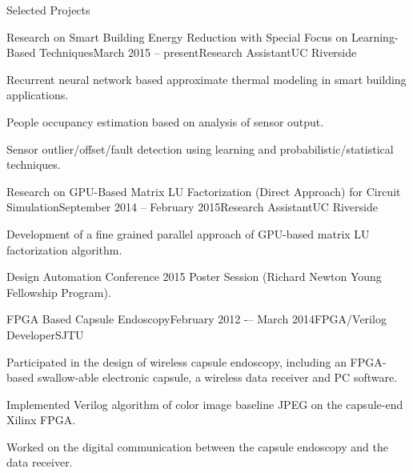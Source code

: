 \documentclass{resume} %
\begin{document}
\begin{rSection}{Selected Projects}


    \begin{rSubsection}{Research on Smart Building Energy Reduction with Special Focus on Learning-Based Techniques}{March 2015 -- present}{Research Assistant}{UC Riverside}

    \item Recurrent neural network based approximate thermal modeling in smart
        building applications.

    \item People occupancy estimation based on analysis of sensor output.

    \item Sensor outlier/offset/fault detection using learning and
        probabilistic/statistical techniques.

    \end{rSubsection}

    \begin{rSubsection}{Research on GPU-Based Matrix LU Factorization (Direct Approach) for Circuit Simulation}{September 2014 -- February 2015}{Research Assistant}{UC Riverside}

    \item Development of a fine grained parallel approach of GPU-based matrix
        LU factorization algorithm.

    \item Design Automation Conference 2015 Poster Session (Richard Newton
        Young Fellowship Program).

    \end{rSubsection}


    \begin{rSubsection}{FPGA Based Capsule Endoscopy}{February 2012 -– March 2014}{FPGA/Verilog Developer}{SJTU}

    \item Participated in the design of wireless capsule endoscopy, including an
        FPGA-based swallow-able electronic capsule, a wireless data receiver and PC
        software.

    \item Implemented Verilog algorithm of color image baseline JPEG on the
        capsule-end Xilinx FPGA.

    \item Worked on the digital communication between the capsule endoscopy and
        the data receiver.


\end{rSubsection}
\end{rSection}
\end{document}
